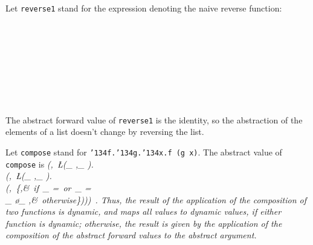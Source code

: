 Let \mbox{\tt reverse1} stand for the expression denoting the naive reverse function:
\begin{flushleft}
\vspace{-0.0em}\vspace{-0.0em}\\
\vspace{-0.0em}\\
\vspace{-0.0em}\\
\vspace{-0.0em}\\
\vspace{-0.0em}\\
\vspace{-0.0em}\\
\vspace{-0.0em}\\
\vspace{-0.0em}
\end{flushleft}
The abstract forward value of \mbox{\tt reverse1} is the identity, so the abstraction of
the elements of a list doesn't change by reversing the list.

Let \mbox{\tt compose} stand for \mbox{\tt {\char'134}f.{\char'134}g.{\char'134}x.f\ (g\ x)}.  The abstract value of \mbox{\tt compose} is
\beqs
\it (\ID,\ \L(\A_{ },\K_{ }).\\
\it (\ID,\ \L(\A_{ },\K_{ }).\\
\it (\ID,\ \left\{\bot,&\it \mbox{\rm\ if}\ \A_{ }=\BOT\mbox{\rm\ or}\ \A_{ }=\BOT\\
\it \K_{ }\o\K_{ },&\it \mbox{\rm\ otherwise}\ea\right\})))\ .
\eeqs
Thus, the
result of the application of the composition of two functions is
dynamic, and maps all values to dynamic values, if either function is
dynamic; otherwise, the result is given by the application of the
composition of the abstract forward values to the abstract argument.

